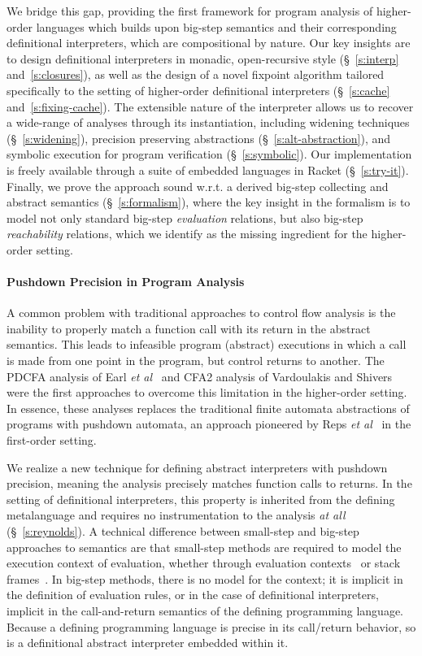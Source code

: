 We bridge this gap, providing the first framework for program analysis of
higher-order languages which builds upon big-step semantics and their
corresponding definitional interpreters, which are compositional by nature. Our
key insights are to design definitional interpreters in monadic, open-recursive
style (§~\ref{s:interp} and~\ref{s:closures}), as well as the design of a novel fixpoint
algorithm tailored specifically to the setting of higher-order definitional
interpreters (§~\ref{s:cache} and~\ref{s:fixing-cache}). The extensible
nature of the interpreter allows us to recover a wide-range of analyses through
its instantiation, including widening techniques (§~\ref{s:widening}),
precision preserving abstractions (§~\ref{s:alt-abstraction}), and
symbolic execution for program verification (§~\ref{s:symbolic}).
Our implementation is freely available through a suite of embedded languages in
Racket (§~\ref{s:try-it}). Finally, we prove the approach sound w.r.t. a
derived big-step collecting and abstract semantics (§~\ref{s:formalism}), where
the key insight in the formalism is to model not only standard big-step
\emph{evaluation} relations, but also big-step \emph{reachability}
relations, which we identify as the missing ingredient for the higher-order
setting.

\paragraph{Pushdown Precision in Program Analysis}
A common problem with traditional approaches to control flow analysis is the
inability to properly match a function call with its return in the abstract
semantics. This leads to infeasible program (abstract) executions in which a
call is made from one point in the program, but control returns to another.
The PDCFA analysis of Earl \emph{et al}~\cite{dvanhorn:Earl2010Pushdown} and
CFA2 analysis of Vardoulakis and Shivers~\cite{dvanhorn:Vardoulakis2011CFA2}
were the first approaches to overcome this limitation in the higher-order
setting. In essence, these analyses replaces the traditional finite automata
abstractions of programs with pushdown automata, an approach pioneered by Reps
\emph{et al}~\cite{dvanhorn:Reps1995Precise} in the first-order setting.

We realize a new technique for defining abstract interpreters with pushdown
precision, meaning the analysis precisely matches function calls to returns. In
the setting of definitional interpreters, this property is inherited from the
defining metalanguage and requires no instrumentation to the analysis \emph{at
all} (§~\ref{s:reynolds}). A technical difference between small-step and
big-step approaches to semantics are that small-step methods are required to
model the execution context of evaluation, whether through evaluation
contexts~\cite{local:felleisen-TCS1992} or stack
frames~\cite{dvanhorn:Felleisen1987Calculus}. In big-step methods, there is no
model for the context; it is implicit in the definition of evaluation rules, or
in the case of definitional interpreters, implicit in the call-and-return
semantics of the defining programming language. Because a defining programming
language is precise in its call/return behavior, so is a definitional abstract
interpreter embedded within it.
